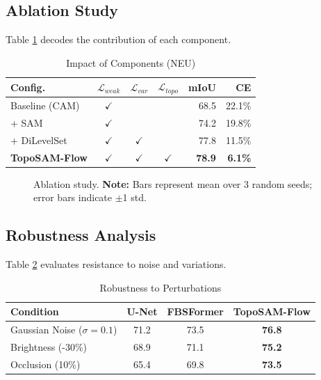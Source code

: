 \documentclass[12pt, a4paper]{article}
\newcommand{\calL}{\mathcal{L}}
\begin{document}
\subsection{Ablation Study}
\label{subsec:ablation}

Table \ref{tab:ablation} decodes the contribution of each component.

\begin{table}[h]
\centering
\caption{Impact of Components (NEU)}
\label{tab:ablation}
\begin{tabular}{lcccrr}
\toprule
\textbf{Config.} & $\calL_{weak}$ & $\calL_{var}$ & $\calL_{topo}$ & \textbf{mIoU} & \textbf{CE} \\
\midrule
Baseline (CAM) & $\checkmark$ & & & 68.5 & 22.1\% \\
+ SAM & $\checkmark$ & & & 74.2 & 19.8\% \\
+ DiLevelSet & $\checkmark$ & $\checkmark$ & & 77.8 & 11.5\% \\
\textbf{TopoSAM-Flow} & $\checkmark$ & $\checkmark$ & $\checkmark$ & \textbf{78.9} & \textbf{6.1\%} \\
\bottomrule
\end{tabular}
\end{table}

\begin{figure}[h]
\centering
{}
\caption{Ablation study. \textbf{Note:} Bars represent mean over 3 random seeds; error bars indicate $\pm$1 std.}
\label{fig:ablation_chart}
\end{figure}

\subsection{Robustness Analysis}
\label{subsec:robustness}

Table \ref{tab:robustness} evaluates resistance to noise and variations.

\begin{table}[h]
\centering
\caption{Robustness to Perturbations}
\label{tab:robustness}
\begin{tabular}{lccc}
\toprule
\textbf{Condition} & \textbf{U-Net} & \textbf{FBSFormer} & \textbf{TopoSAM-Flow} \\
\midrule
Gaussian Noise ($\sigma=0.1$) & 71.2 & 73.5 & \textbf{76.8} \\
Brightness (-30\%) & 68.9 & 71.1 & \textbf{75.2} \\
Occlusion (10\%) & 65.4 & 69.8 & \textbf{73.5} \\
\bottomrule
\end{tabular}
\end{table}
\end{document}
